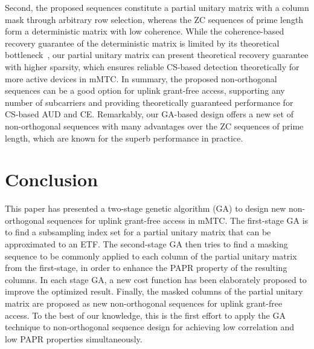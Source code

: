 \documentclass[journal]{IEEEtran}
\newcommand{\Abu}{{\bf A}}
\newcommand{\Wbu}{{\bf W}}
\numberwithin{const2}{const}
\begin{document}
Second, the proposed sequences constitute a partial unitary matrix with a column mask
through arbitrary row selection,
whereas the ZC sequences of prime length form a deterministic matrix with low coherence.
While the coherence-based recovery guarantee of the deterministic matrix 
is limited by its theoretical bottleneck~\cite{Eldar:CS},
our partial unitary matrix can present theoretical recovery guarantee with higher sparsity,
which ensures reliable CS-based detection theoretically for more active devices in mMTC.
In summary, the proposed non-orthogonal sequences %
can be a good option for uplink grant-free access,
supporting any number of subcarriers and %
providing theoretically guaranteed performance for CS-based AUD and CE.
Remarkably, our GA-based design offers a new set of non-orthogonal sequences
with many advantages over the ZC sequences of prime length,
which are known for the superb performance in practice.












\section{Conclusion}
This paper has presented
a two-stage genetic algorithm (GA) to design new non-orthogonal sequences
for uplink grant-free access in mMTC. %
The first-stage GA is to find a subsampling index set 
for a partial unitary matrix that can be approximated to an ETF.
The second-stage GA then tries to find a masking sequence to be commonly applied  
to each column of the partial unitary matrix from the first-stage,
in order to enhance the PAPR property of the resulting columns.
In each stage GA, a new cost function has been elaborately proposed 
to improve the optimized result.
Finally, the masked columns of the partial unitary matrix
are proposed as new non-orthogonal sequences for uplink grant-free access.
To the best of our knowledge, this is the first effort to apply the GA technique
to non-orthogonal sequence design for achieving low correlation 
and low PAPR properties simultaneously.
\end{document}
